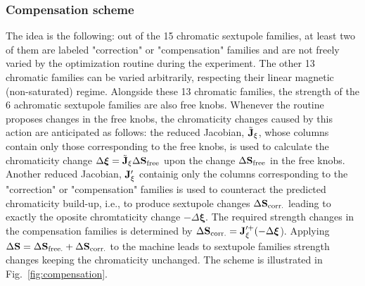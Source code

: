 \subsubsection{Compensation scheme}
\label{subsubsec:compensation}
The idea is the following: out of the 15 chromatic sextupole families, at least two of them are labeled "correction" or "compensation" families and are not freely varied by the optimization routine during the experiment. The other 13 chromatic families can be varied arbitrarily, respecting their linear magnetic (non-saturated) regime. Alongside these 13 chromatic families, the strength of the 6 achromatic sextupole families are also free knobs.  Whenever the routine proposes changes in the free knobs, the chromaticity changes caused by this action are anticipated as follows: the reduced Jacobian, $\tilde{\vb{J}}_\xi$, whose columns contain only those corresponding to the free knobs, is used to calculate the chromaticity change $\Delta \boldsymbol{\xi}=\tilde{\vb{J}}_\xi\Delta\vb{S}_{\text{free}}$ upon the change $\Delta\vb{S}_{\text{free}}$ in the free knobs. Another reduced Jacobian, $\vb{J}_{\xi}^{\prime}$ containig only the columns corresponding to the "correction" or "compensation" families is used to counteract the predicted chromaticity build-up, i.e., to produce sextupole changes $\Delta\vb{S}_{\text{corr.}}$ leading to exactly the oposite chromtaticity change $-\Delta \boldsymbol{\xi}$. The required strength changes in the compensation families is determined by $\Delta \vb{S}_{\text{corr.}} = \vb{J}_{\xi}^{\prime +}(-\Delta \boldsymbol{\xi}$). Applying $\Delta \vb{S} = \Delta \vb{S}_{\text{free.}} + \Delta \vb{S}_{\text{corr.}}$ to the machine leads to sextupole families strength changes keeping the chromaticity unchanged. The scheme is illustrated in Fig.~\ref{fig:compensation}.

